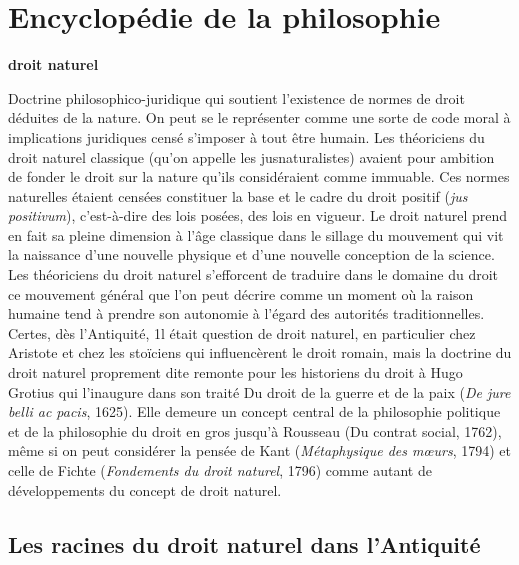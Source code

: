 
\section{Encyclopédie de la philosophie}
{\bf droit naturel}

\vspace{.7cm}
Doctrine philosophico-juridique qui soutient l’existence de normes
de droit déduites de la nature. On peut se
le représenter comme une sorte de code
moral à implications juridiques censé
s'imposer à tout être humain. Les théoriciens du droit naturel classique (qu’on
appelle les jusnaturalistes) avaient pour
ambition de fonder le droit sur la nature
qu'ils considéraient comme immuable.
Ces normes naturelles étaient censées
constituer la base et le cadre du droit
positif ({\it jus positivum}), c'est-à-dire des lois
posées, des lois en vigueur. Le droit naturel prend en fait sa pleine dimension à
l’âge classique dans le sillage du mouvement qui vit la naissance d’une nouvelle
physique et d’une nouvelle conception de
la science. Les théoriciens du droit naturel
s'efforcent de traduire dans le domaine
%
du droit ce mouvement général que l’on
peut décrire comme un moment où la raison humaine tend à prendre son autonomie à l’égard des autorités traditionnelles.
Certes, dès l’Antiquité, 1l était question
de droit naturel, en particulier chez Aristote et chez les stoïciens qui influencèrent
le droit romain, mais la doctrine du droit
naturel proprement dite remonte pour les
historiens du droit à Hugo Grotius qui
l’inaugure dans son traité Du droit de la
guerre et de la paix ({\it De jure belli ac pacis},
1625). Elle demeure un concept central de
la philosophie politique et de la philosophie du droit en gros jusqu’à Rousseau
(Du contrat social, 1762), même si on peut
considérer la pensée de Kant ({\it Métaphysique des mœurs}, 1794) et celle de Fichte
({\it Fondements du droit naturel}, 1796)
comme autant de développements du
concept de droit naturel.

\subsection{Les racines du droit naturel
dans l'Antiquité}


